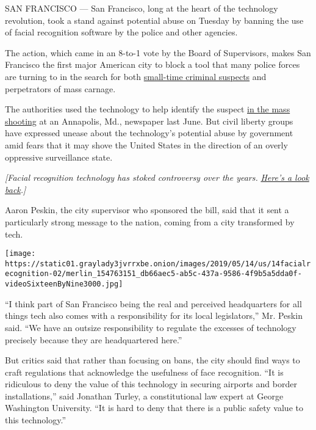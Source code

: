 SAN FRANCISCO --- San Francisco, long at the heart of the technology
revolution, took a stand against potential abuse on Tuesday by banning
the use of facial recognition software by the police and other agencies.

The action, which came in an 8-to-1 vote by the Board of Supervisors,
makes San Francisco the first major American city to block a tool that
many police forces are turning to in the search for both
\href{https://www.washingtonpost.com/technology/2019/04/30/amazons-facial-recognition-technology-is-supercharging-local-police/}{small-time
criminal suspects} and perpetrators of mass carnage.

The authorities used the technology to help identify the suspect
\href{https://www.nytimes3xbfgragh.onion/2019/04/29/us/capital-gazette-shooting-suspect.html}{in
the mass shooting} at an Annapolis, Md., newspaper last June. But civil
liberty groups have expressed unease about the technology's potential
abuse by government amid fears that it may shove the United States in
the direction of an overly oppressive surveillance state.

\emph{{[}Facial recognition technology has stoked controversy over the
years.}
\href{https://www.nytimes3xbfgragh.onion/2019/05/15/business/facial-recognition-software-controversy.html?action=click\&module=Intentional\&pgtype=Article}{\emph{Here's
a look back}}\emph{.{]}}

Aaron Peskin, the city supervisor who sponsored the bill, said that it
sent a particularly strong message to the nation, coming from a city
transformed by tech.

\texttt{[image: https://static01.graylady3jvrrxbe.onion/images/2019/05/14/us/14facialrecognition-02/merlin\_154763151\_db66aec5-ab5c-437a-9586-4f9b5a5dda0f-videoSixteenByNine3000.jpg]}

``I think part of San Francisco being the real and perceived
headquarters for all things tech also comes with a responsibility for
its local legislators,'' Mr. Peskin said. ``We have an outsize
responsibility to regulate the excesses of technology precisely because
they are headquartered here.''

But critics said that rather than focusing on bans, the city should find
ways to craft regulations that acknowledge the usefulness of face
recognition. ``It is ridiculous to deny the value of this technology in
securing airports and border installations,'' said Jonathan Turley, a
constitutional law expert at George Washington University. ``It is hard
to deny that there is a public safety value to this technology.''


